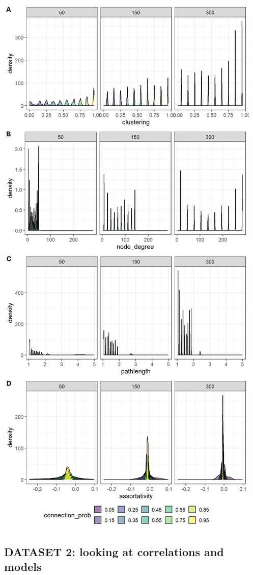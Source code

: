 \documentclass[
]{article}
\begin{document}
\begin{center}\includegraphics{./Figures/unnamed-chunk-69-1} \end{center}

\hypertarget{dataset-2-looking-at-correlations-and-models}{%
\subsection{DATASET 2: looking at correlations and
models}\label{dataset-2-looking-at-correlations-and-models}}
\end{document}
